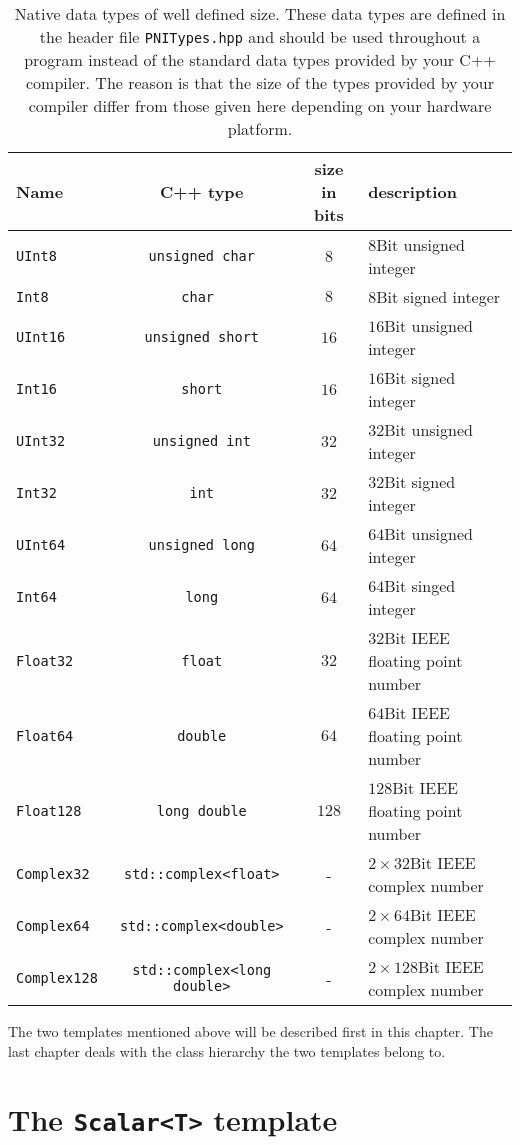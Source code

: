 \begin{table}[tb]
\begin{tabular}{l|c|c|l}
\hline
Name & C++ type & size in bits & description \\
\hline
{\tt UInt8} & {\tt unsigned char}& $8$ & $8$Bit unsigned integer\\
{\tt Int8}  & {\tt char } & $8$ & $8$Bit signed integer \\
{\tt UInt16} & {\tt unsigned short} &$16$ & $16$Bit unsigned integer \\
{\tt Int16} & {\tt short} & $16$ & $16$Bit signed integer \\
{\tt UInt32} & {\tt unsigned int} & $32$ & $32$Bit unsigned integer\\
{\tt Int32} & {\tt int} & $32$ & $32$Bit signed integer \\
{\tt UInt64} & {\tt unsigned long} & $64$ & $64$Bit unsigned integer\\
{\tt Int64} & {\tt long} & $64$ & $64$Bit singed integer \\ 
\hline
{\tt Float32} & {\tt float} & $32$ & $32$Bit IEEE floating point number \\
{\tt Float64} & {\tt double} & $64$ & $64$Bit IEEE floating point number \\
{\tt Float128} & {\tt long double} & $128$ & $128$Bit IEEE floating point number
\\
\hline
{\tt Complex32} & {\tt std::complex<float>} & - & $2\times32$Bit IEEE complex number \\
{\tt Complex64} & {\tt std::complex<double>} & - & $2\times64$Bit IEEE complex
number \\
{\tt Complex128} & {\tt std::complex<long double>} & - & $2\times128$Bit IEEE
complex number \\
\hline
\end{tabular}
\caption{{\small \label{tab:datatypes} Native data types of well defined size.
These data types are defined in the header file {\tt PNITypes.hpp} and should 
be used throughout a program instead of the standard data types provided by 
your C++ compiler. The reason is that the size of the types provided by your 
compiler differ from those given here depending on your hardware platform.}}
\end{table}

The two templates mentioned above will be described first in this chapter.
The last chapter deals with the class hierarchy the two templates belong to.

\section{The {\tt Scalar<T>} template}

